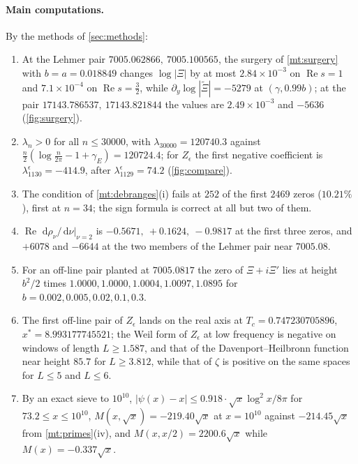 \documentclass[11pt]{article}
\theoremstyle{definition}\newtheorem{definition}[theorem]{Definition}
\theoremstyle{remark}\newtheorem{remark}[theorem]{Remark}
\newcommand{\dd}{\,\mathrm d}\newcommand{\e}{\mathrm e}
\renewcommand{\Re}{\operatorname{Re}}\renewcommand{\Im}{\operatorname{Im}}
\begin{document}
\paragraph{Main computations.} By the methods of \cref{sec:methods}:
\begin{enumerate}[label=(\arabic*)]
\item At the Lehmer pair $7005.062866,\ 7005.100565$, the surgery of \cref{mt:surgery} with $b=a=0.018849$ changes $\log|\Xi|$ by at most $2.84\times10^{-3}$ on $\Re s=1$ and $7.1\times10^{-4}$ on $\Re s=\frac32$, while $\partial_y\log|\widetilde\Xi|=-5279$ at $(\gamma,0.99b)$; at the pair $17143.786537,\ 17143.821844$ the values are $2.49\times10^{-3}$ and $-5636$ (\cref{fig:surgery}).
\item $\lambda_n>0$ for all $n\le30000$, with $\lambda_{30000}=120740.3$ against $\frac n2(\log\frac n{2\pi}-1+\gamma_E)=120724.4$; for $Z_\epsilon$ the first negative coefficient is $\lambda^\epsilon_{1130}=-414.9$, after $\lambda^\epsilon_{1129}=74.2$ (\cref{fig:compare}).
\item The condition of \cref{mt:debranges}(i) fails at $252$ of the first $2469$ zeros ($10.21\%$), first at $n=34$; the sign formula is correct at all but two of them.
\item $\Re\,\dd\rho_\nu/\dd\nu|_{\nu=2}$ is $-0.5671,\ +0.1624,\ -0.9817$ at the first three zeros, and $+6078$ and $-6644$ at the two members of the Lehmer pair near $7005.08$.
\item For an off-line pair planted at $7005.0817$ the zero of $\Xi+i\Xi'$ lies at height $b^2/2$ times $1.0000,1.0000,1.0004,1.0097,1.0895$ for $b=0.002,0.005,0.02,0.1,0.3$.
\item The first off-line pair of $Z_\epsilon$ lands on the real axis at $T_c=0.747230705896$, $x^*=8.993177745521$; the Weil form of $Z_\epsilon$ at low frequency is negative on windows of length $L\ge1.587$, and that of the Davenport--Heilbronn function near height $85.7$ for $L\ge3.812$, while that of $\zeta$ is positive on the same spaces for $L\le5$ and $L\le6$.
\item By an exact sieve to $10^{10}$, $|\psi(x)-x|\le0.918\cdot\sqrt x\log^2x/8\pi$ for $73.2\le x\le10^{10}$, $M(x,\sqrt x)=-219.40\sqrt x$ at $x=10^{10}$ against $-214.45\sqrt x$ from \cref{mt:primes}(iv), and $M(x,x/2)=2200.6\sqrt x$ while $M(x)=-0.337\sqrt x$.
\end{enumerate}
\end{document}
